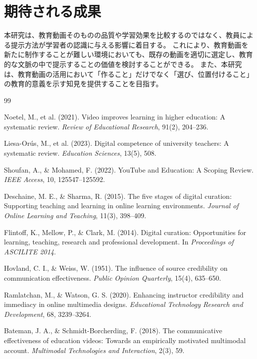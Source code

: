 \documentclass[a4paper,10pt]{ltjsarticle}
\begin{document}
\section{期待される成果}

本研究は、教育動画そのものの品質や学習効果を比較するのではなく、教員による提示方法が学習者の認識に与える影響に着目する。
これにより、教育動画を新たに制作することが難しい環境においても、既存の動画を適切に選定し、教育的な文脈の中で提示することの価値を検討することができる。
また、本研究は、教育動画の活用において「作ること」だけでなく「選び、位置付けること」の教育的意義を示す知見を提供することを目指す。


\begin{thebibliography}{99}

Noetel, M., et al. (2021).
Video improves learning in higher education: A systematic review.
\textit{Review of Educational Research}, 91(2), 204--236.

Liesa-Orús, M., et al. (2023).
Digital competence of university teachers: A systematic review.
\textit{Education Sciences}, 13(5), 508.

Shoufan, A., \& Mohamed, F. (2022).
YouTube and Education: A Scoping Review.
\textit{IEEE Access}, 10, 125547--125592.

Deschaine, M. E., \& Sharma, R. (2015).
The five stages of digital curation: Supporting teaching and learning in online learning environments.
\textit{Journal of Online Learning and Teaching}, 11(3), 398--409.

Flintoff, K., Mellow, P., \& Clark, M. (2014).
Digital curation: Opportunities for learning, teaching, research and professional development.
In \textit{Proceedings of ASCILITE 2014}.

Hovland, C. I., \& Weiss, W. (1951).
The influence of source credibility on communication effectiveness.
\textit{Public Opinion Quarterly}, 15(4), 635--650.

Ramlatchan, M., \& Watson, G. S. (2020).
Enhancing instructor credibility and immediacy in online multimedia designs.
\textit{Educational Technology Research and Development}, 68, 3239--3264.

Bateman, J. A., \& Schmidt-Borcherding, F. (2018).
The communicative effectiveness of education videos:
Towards an empirically motivated multimodal account.
\textit{Multimodal Technologies and Interaction}, 2(3), 59.

\end{thebibliography}
\end{document}

